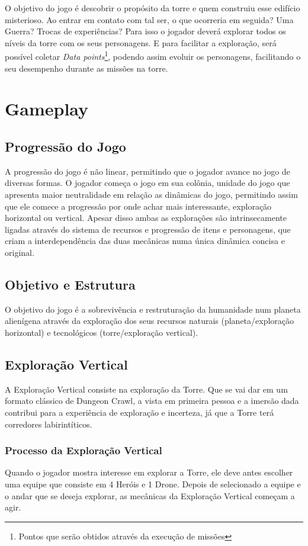 \documentclass[11pt]{article} %
\begin{document}
O objetivo do jogo é descobrir o propósito da torre e quem construiu esse edifício misterioso. Ao entrar em contato com tal ser, o que ocorreria em seguida? Uma Guerra? Trocas de experiências? Para isso o jogador deverá explorar todos os níveis da torre com os seus personagens. E para facilitar a exploração, será possível coletar \textit{Data points}\footnote{Pontos que serão obtidos através da execução de missões}, podendo assim evoluir os personagens, facilitando o seu desempenho durante as missões na torre. 


\section{Gameplay}

\subsection{Progressão do Jogo}
A progressão do jogo é não linear, permitindo que o jogador avance no jogo de diversas formas. O jogador começa o jogo em sua colônia, unidade do jogo que apresenta maior neutralidade em relação as dinâmicas do jogo, permitindo assim que ele comece a progressão por onde achar mais interessante, exploração horizontal ou vertical. Apesar disso ambas as explorações são intrinsecamente ligadas através do sistema de recursos e progressão de itens e personagens, que criam a interdependência das duas mecânicas numa única dinâmica concisa e original. 

\subsection{Objetivo e Estrutura}
O objetivo do jogo é a sobrevivência e restruturação da humanidade num planeta alienígena através da exploração dos seus recursos naturais (planeta/exploração horizontal) e tecnológicos (torre/exploração vertical).

\subsection{Exploração Vertical}
A Exploração Vertical consiste na exploração da Torre. Que se vai dar em um formato clássico de Dungeon Crawl, a vista em primeira pessoa e a imersão dada contribui para a experiência de exploração e incerteza, já que a Torre terá corredores labirintíticos.

\subsubsection{Processo da Exploração Vertical}
Quando o jogador mostra interesse em explorar a Torre, ele deve antes escolher uma equipe que consiste em 4 Heróis e 1 Drone. Depois de selecionado a equipe e o andar que se deseja explorar, as mecânicas da Exploração Vertical começam a agir.
\end{document}
